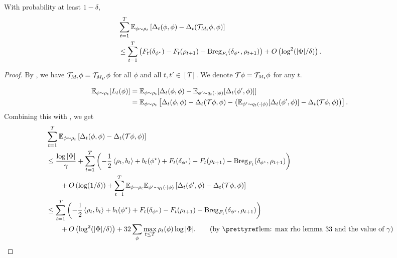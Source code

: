\begin{lemma}\label{lem: bilievel final bound}
   With probability at least $1-\delta$, 
  \begin{align*}
    &\sum_{t=1}^T \mathbb{E}_{\phi\sim \rho_t} \left[\Delta_t(\phi, \phi) - \Delta_t(\mathcal{T}_{M_t}\phi, \phi)\right] \\
    &\leq \sum_{t=1}^T  \left(F_t(\delta_{\phi^\star}) - F_t(\rho_{t+1}) - \textup{Breg}_{F_t}(\delta_{\phi^\star}, \rho_{t+1})\right) + O\left(\log^2(|\Phi|/\delta)\right). 
\end{align*}
\end{lemma}
\begin{proof}
By , we have $\mathcal{T}_{M_t}\phi = \mathcal{T}_{M_{t'}}\phi$ for all $\phi$ and all $t,t'\in[T]$. We denote $\mathcal{T} \phi = \mathcal{T}_{M_{t}}\phi$ for any $t$. 


\begin{align*}
    \mathbb{E}_{\phi\sim \rho_t}[L_t(\phi)] 
    &= \mathbb{E}_{\phi\sim \rho_t}[\Delta_t(\phi, \phi) - \mathbb{E}_{\phi'\sim q_t(\cdot|\phi)}[\Delta_t(\phi', \phi)]] \\
    &= \mathbb{E}_{\phi\sim \rho_t}\left[\Delta_t(\phi, \phi) - \Delta_t(\mathcal{T}\phi, \phi) - \left(\mathbb{E}_{\phi'\sim q_t(\cdot|\phi)}[\Delta_t(\phi', \phi)] - \Delta_t(\mathcal{T}\phi, \phi)\right)\right].
\end{align*}
Combining this with , we get 
\begin{align*}
   &\sum_{t=1}^T \E_{\phi\sim \rho_t} \left[\Delta_t(\phi, \phi) - \Delta_t(\calT\phi, \phi)\right] \\
   &\leq \frac{\log|\Phi|}{\gamma} + \sum_{t=1}^T \left(- \frac{1}{2} \inner{\rho_{t}, b_t} + b_t(\phi^\star) +  F_t(\delta_{\phi^\star}) - F_t(\rho_{t+1}) - \breg_{F_t}(\delta_{\phi^\star}, \rho_{t+1}) \right) \\
   &\qquad + O\left(\log(1/\delta)\right)   + \sum_{t=1}^T \E_{\phi\sim \rho_t}\E_{\phi'\sim q_t(\cdot|\phi)}\left[\Delta_t(\phi', \phi) - \Delta_t(\calT\phi, \phi)\right] \\
   &\leq \sum_{t=1}^T \left(- \frac{1}{2} \inner{\rho_{t}, b_t} + b_t(\phi^\star) +  F_t(\delta_{\phi^\star}) - F_t(\rho_{t+1}) - \breg_{F_t}(\delta_{\phi^\star}, \rho_{t+1})\right) \\
   &\qquad + O\left(\log^2(|\Phi|/\delta)\right)  + 32\sum_\phi \max_{t\leq T} \rho_t(\phi) \log|\Phi|.   \tag{by \pref{lem: max rho lemma 33} and the value of $\gamma$} %
\end{align*}


\end{proof}
